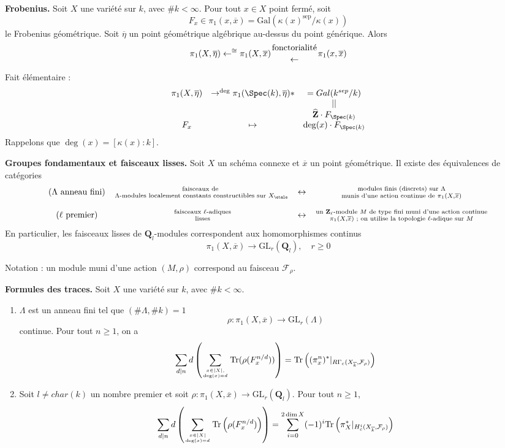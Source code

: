 \medskip\noindent
{\bf Frobenius.} Soit $X$ une variété sur $k$, avec $\# k < \infty$. Pour tout $x \in X$
point fermé, soit
$$
F_x\in \pi_1(x, \overline{x}) =
\text{Gal}(\kappa(x)^{\text{sep}}/\kappa(x))
$$
le Frobenius géométrique.
Soit $\overline\eta$ un point géométrique algébrique au-dessus du point générique. Alors
$$
\pi_1(X, \overline\eta) \leftarrow^{\cong}
\pi_1(X, \overline{x})
{\text{fonctorialité} \atop \leftarrow} \pi_1(x, \overline{x})
$$

\noindent
Fait élémentaire :
$$
\begin{matrix}
\pi_1(X, \overline \eta) & \to^{\deg} \pi_1(\Spec(k), \overline \eta) * &
= Gal(k^{sep}/k) \\
& & || \\
& & \widehat{\mathbf{Z}}\cdot F_{\Spec(k)} \\
F_x & \mapsto & \deg(x)\cdot F_{\Spec(k)}
\end{matrix}
$$
Rappelons que $\deg(x) = [\kappa(x):k]$.

\medskip\noindent
{\bf Groupes fondamentaux et faisceaux lisses.}
Soit $X$ un schéma connexe et $\overline{x}$ un point géométrique. Il existe des
équivalences de catégories
$$
\begin{matrix}
(\Lambda\text{ anneau fini}) &
\text{faisceaux de }
\atop \Lambda\text{-modules localement constants constructibles sur }X_\etale & \leftrightarrow &
\text{ modules finis (discrets) sur }\Lambda\text{ }
\atop \text{ munis d'une action continue de }\pi_1(X, \overline{x})\text{ }\\
\\
(\ell\text{ premier}) & \text{ faisceaux }\ell\text{-adiques} \atop \text{ lisses} &
\leftrightarrow &
\text{un }\mathbf{Z}_\ell
\text{-module }M\text{ de type fini muni d'une action continue}
\atop \pi_1(X, \overline{x})\text{ ; on utilise la topologie }
\ell\text{-adique sur }M
\end{matrix}
$$
En particulier, les faisceaux lisses de $\mathbf{Q}_l$-modules correspondent aux
homomorphismes continus
$$
\pi_1(X, \overline{x}) \to \text{GL}_r(\mathbf{Q}_l), \quad r\geq 0
$$

\noindent
Notation : un module muni d'une action $(M, \rho)$ correspond au faisceau
$\mathcal{F}_\rho$.

\medskip\noindent
{\bf Formules des traces.} Soit $X$ une variété sur $k$, avec $\# k < \infty$.
\begin{enumerate}
\item $\Lambda$ est un anneau fini tel que $(\# \Lambda, \# k)=1$
$$
\rho : \pi_1(X, \overline{x})\to \text{GL}_r(\Lambda)
$$
continue. Pour tout $n\geq 1$, on a
$$
\sum_{d|n}d\left(
\sum_{x\in |X|, \atop \deg(x)=d}
\text{Tr}(\rho(F_x^{n/d}))\right) =
\text{Tr}\left(
(\pi_x^n)^* |_{R\Gamma_c(X_{\overline{k}}, \mathcal{F}_\rho)}\right)
$$
\item Soit $l\neq char(k)$ un nombre premier et soit $\rho : \pi_1(X, \overline{x})\to
\text{GL}_r(\mathbf{Q}_l)$. Pour tout $n\geq 1$,
$$
\sum_{d|n} d\left(
\sum_{x\in |X| \atop \deg(x)=d}
\text{Tr}
\left(
\rho(F_x^{n/d})
\right)
\right) =
\sum_{i = 0}^{2\dim X}
(-1)^i
\text{Tr}\left(
\pi_X^* |_{H_c^i(X_{\overline{k}}, \mathcal{F}_\rho)}\right)
$$
\end{enumerate}

